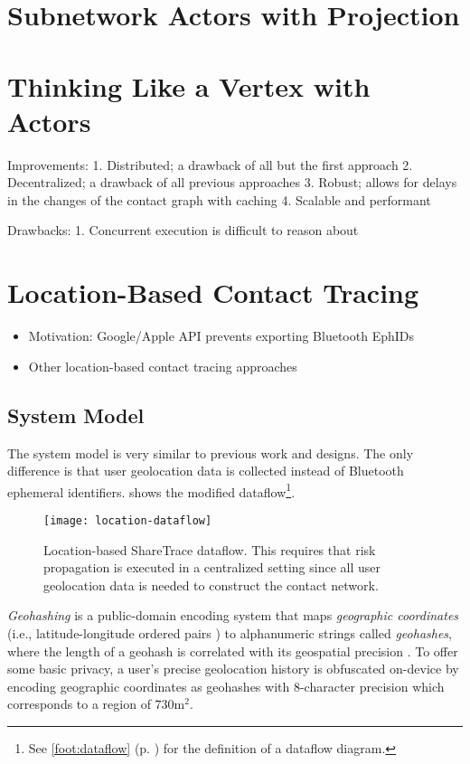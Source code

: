 \section{Subnetwork Actors with Projection}\label{sec:projected-subgraphs}
%


\section{Thinking Like a Vertex with Actors}\label{sec:vertex-actors}

Improvements:
1. Distributed; a drawback of all but the first approach
2. Decentralized; a drawback of all previous approaches
3. Robust; allows for delays in the changes of the contact graph with caching
4. Scalable and performant

Drawbacks:
1. Concurrent execution is difficult to reason about

\section{Location-Based Contact Tracing}\label{sec:location-based}
	\begin{itemize}
	\item Motivation: Google/Apple API prevents exporting Bluetooth EphIDs
	\item Other location-based contact tracing approaches
	\end{itemize}
\subsection{System Model}
The system model is very similar to previous work \cite{Ayday2020, Ayday2021} and designs. The only difference is that user geolocation data is collected instead of Bluetooth ephemeral identifiers.  shows the modified dataflow\footnote{See \cref{foot:dataflow} (p. ) for the definition of a dataflow diagram.}.
	\begin{figure}[ht!]
		\texttt{[image: location-dataflow]}
		\caption[Geolocation-based ShareTrace dataflow]{Location\hyp{}based ShareTrace dataflow. This requires that risk propagation is executed in a centralized setting since all user geolocation data is needed to construct the contact network.}
		\label{fig:location-based}
	\end{figure}
\emph{Geohashing} is a public\hyp{}domain encoding system that maps \emph{geographic coordinates} (i.e., latitude\hyp{}longitude ordered pairs \cite[p. 5]{Sickle2004}) to alphanumeric strings called \emph{geohashes}, where the length of a geohash is correlated with its geospatial precision \cite{Morton1966}. To offer some basic privacy, a user's precise geolocation history is obfuscated on\hyp{}device by encoding geographic coordinates as geohashes with 8\hyp{}character precision which corresponds to a region of $730\mathrm{m}^2$.

